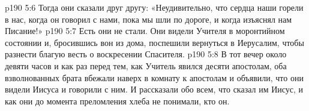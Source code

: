 \vs p190 5:6 Тогда они сказали друг другу: «Неудивительно, что сердца наши горели в нас, когда он говорил с нами, пока мы шли по дороге, и когда изъяснял нам Писание!»
\vs p190 5:7 Есть они не стали. Они видели Учителя в моронтийном состоянии и, бросившись вон из дома, поспешили вернуться в Иерусалим, чтобы разнести благую весть о воскресении Спасителя.
\vs p190 5:8 В тот вечер около девяти часов и как раз перед тем, как Учитель явился десяти апостолам, оба взволнованных брата вбежали наверх в комнату к апостолам и объявили, что они видели Иисуса и говорили с ним. И рассказали обо всем, что сказал им Иисус, и как они до момента преломления хлеба не понимали, кто он.
